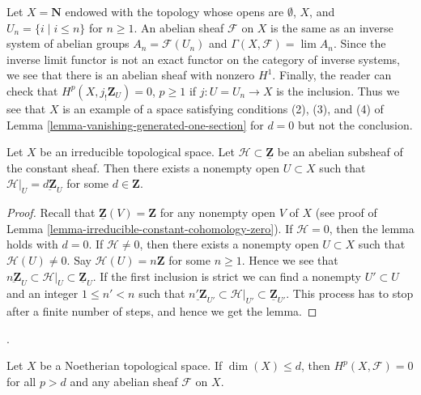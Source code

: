 \begin{example}
\label{example-datta}
Let $X = \mathbf{N}$ endowed with the topology whose opens are
$\emptyset$, $X$, and $U_n = \{i \mid i \leq n\}$ for $n \geq 1$.
An abelian sheaf $\mathcal{F}$ on $X$ is the same as an inverse
system of abelian groups $A_n = \mathcal{F}(U_n)$ and
$\Gamma(X, \mathcal{F}) = \lim A_n$. Since the inverse limit
functor is not an exact functor on the category of inverse systems,
we see that there is an abelian sheaf with nonzero $H^1$.
Finally, the reader can check that $H^p(X, j_!\mathbf{Z}_U) = 0$,
$p \geq 1$ if $j : U = U_n \to X$ is the inclusion. Thus we see
that $X$ is an example of a space satisfying conditions (2), (3), and (4) of
Lemma \ref{lemma-vanishing-generated-one-section} for $d = 0$
but not the conclusion.
\end{example}

\begin{lemma}
\label{lemma-subsheaf-irreducible}
Let $X$ be an irreducible topological space.
Let $\mathcal{H} \subset \underline{\mathbf{Z}}$ be
an abelian subsheaf of the constant sheaf.
Then there exists a nonempty open $U \subset X$ such
that $\mathcal{H}|_U = \underline{d\mathbf{Z}}_U$
for some $d \in \mathbf{Z}$.
\end{lemma}

\begin{proof}
Recall that $\underline{\mathbf{Z}}(V) = \mathbf{Z}$
for any nonempty open $V$ of $X$ (see proof of
Lemma \ref{lemma-irreducible-constant-cohomology-zero}).
If $\mathcal{H} = 0$, then the lemma holds with $d = 0$.
If $\mathcal{H} \not = 0$, then there exists a nonempty open
$U \subset X$ such that $\mathcal{H}(U) \not = 0$.
Say $\mathcal{H}(U) = n\mathbf{Z}$ for some $n \geq 1$.
Hence we see that
$\underline{n\mathbf{Z}}_U
\subset \mathcal{H}|_U \subset
\underline{\mathbf{Z}}_U$. If the first inclusion is strict we
can find a nonempty $U' \subset U$ and an integer $1 \leq n' < n$
such that
$\underline{n'\mathbf{Z}}_{U'}
\subset \mathcal{H}|_{U'} \subset
\underline{\mathbf{Z}}_{U'}$.
This process has to stop after a finite number of steps, and
hence we get the lemma.
\end{proof}

\begin{proposition}[Grothendieck]
\label{proposition-vanishing-Noetherian}
\begin{reference}
\cite[Theorem 3.6.5]{Tohoku}.
\end{reference}
Let $X$ be a Noetherian topological space.
If $\dim(X) \leq d$, then $H^p(X, \mathcal{F}) = 0$
for all $p > d$ and any abelian sheaf $\mathcal{F}$
on $X$.
\end{proposition}

